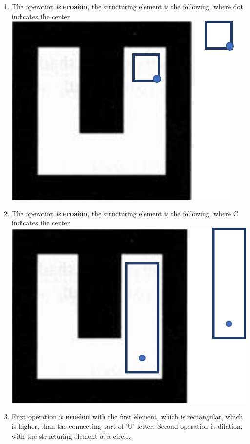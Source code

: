 \documentclass[a4paper]{iacas}
\begin{document}
\begin{enumerate}[label=(\alph*.)]

\item The operation is \textbf{erosion}, the structuring element is the following, where dot indicates the center
\newline
\newline
\includegraphics{imgs/q3_11.png}
\item The operation is \textbf{erosion}, the structuring element is the following, where C indicates the center
\newline
\newline
\includegraphics{imgs/q3_12.png}
\item First operation is \textbf{erosion} with the first element, which is rectangular, which is higher, than the connecting part of 'U' letter. Second operation is dilation, with the structuring element of a circle.

\end{enumerate}
\end{document}

